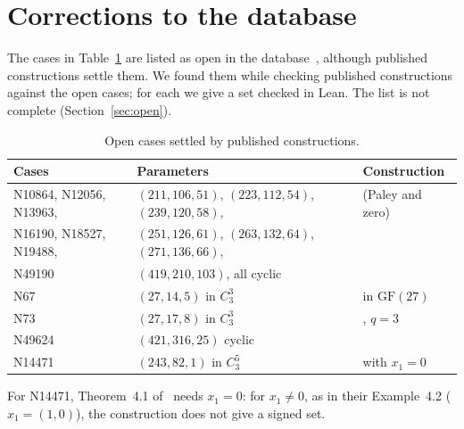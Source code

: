\section{Corrections to the database}\label{sec:corrections}

The \corrections{} cases in Table~\ref{tab:corrections} are listed as open in the
database~\cite{gordon-db}, although published constructions settle them. We found them while
checking published constructions against the open cases; for each we give a set checked in
Lean. The list is not complete (Section~\ref{sec:open}).

\begin{table}[ht]\small
\caption{Open cases settled by published constructions.}\label{tab:corrections}
\begin{tabular}{@{}lll@{}}
\toprule
Cases & Parameters & Construction \\ \midrule
N10864, N12056, N13963, & $(211,106,51)$, $(223,112,54)$, $(239,120,58)$, & \cite[Prop.~2.3]{gordon}
  (Paley and zero) \\
N16190, N18527, N19488, & $(251,126,61)$, $(263,132,64)$, $(271,136,66)$, & \\
N49190 & $(419,210,103)$, all cyclic & \\
N67 & $(27,14,5)$ in $C_3^3$ & \cite[Prop.~2.3]{gordon} in $\mathrm{GF}(27)$ \\
N73 & $(27,17,8)$ in $C_3^3$ & \cite[Thm.~4.1]{gordon}, $q = 3$ \\
N49624 & $(421,316,25)$ cyclic & \cite[Prop.~5.5(2)]{he-chen-ge} \\
N14471 & $(243,82,1)$ in $C_3^5$ & \cite[Thm.~4.1]{he-chen-ge} with $x_1 = 0$ \\
\bottomrule
\end{tabular}
\end{table}

For N14471, Theorem~4.1 of~\cite{he-chen-ge} needs $x_1 = 0$: for $x_1 \neq 0$, as in their
Example~4.2 ($x_1 = (1,0)$), the construction does not give a signed set.
